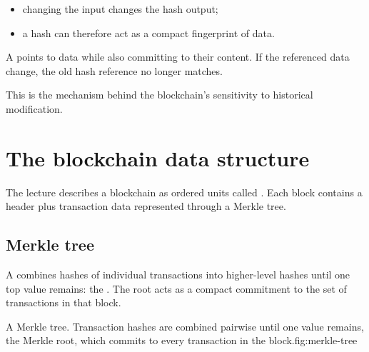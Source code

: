 \begin{itemize}
  \item changing the input changes the hash output;
  \item a hash can therefore act as a compact fingerprint of data.
\end{itemize}

A  points to data while also committing to their content. If the referenced data change, the old hash reference no longer matches.

This is the mechanism behind the blockchain's sensitivity to historical modification.

\section{The blockchain data structure}

The lecture describes a blockchain as ordered units called . Each block contains a header plus transaction data represented through a Merkle tree.

\subsection{Merkle tree}

A  combines hashes of individual transactions into higher-level hashes until one top value remains: the . The root acts as a compact commitment to the set of transactions in that block.

\begin{utpfig}{A Merkle tree. Transaction hashes are combined pairwise until one value remains, the Merkle root, which commits to every transaction in the block.}{fig:merkle-tree}
\end{utpfig}

